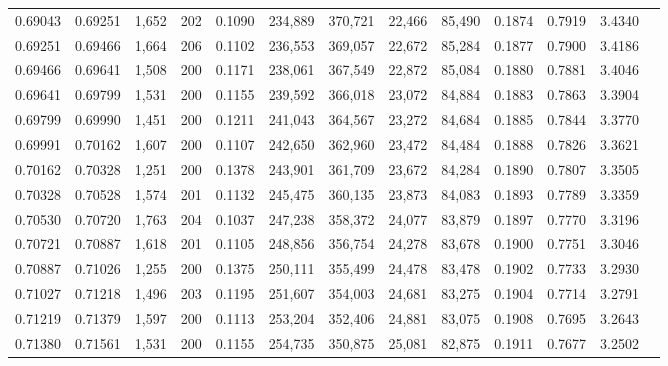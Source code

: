 \begin{tabular}{rrrrrrrrrrrrr}
0.69043 & 0.69251 & 1,652 & 202 &                                     0.1090 & 234,889 & 370,721 &  22,466 &  85,490 & 0.1874 & 0.7919 & 3.4340 \\
0.69251 & 0.69466 & 1,664 & 206 &                                     0.1102 & 236,553 & 369,057 &  22,672 &  85,284 & 0.1877 & 0.7900 & 3.4186 \\
0.69466 & 0.69641 & 1,508 & 200 &                                     0.1171 & 238,061 & 367,549 &  22,872 &  85,084 & 0.1880 & 0.7881 & 3.4046 \\
0.69641 & 0.69799 & 1,531 & 200 &                                     0.1155 & 239,592 & 366,018 &  23,072 &  84,884 & 0.1883 & 0.7863 & 3.3904 \\
0.69799 & 0.69990 & 1,451 & 200 &                                     0.1211 & 241,043 & 364,567 &  23,272 &  84,684 & 0.1885 & 0.7844 & 3.3770 \\
0.69991 & 0.70162 & 1,607 & 200 &                                     0.1107 & 242,650 & 362,960 &  23,472 &  84,484 & 0.1888 & 0.7826 & 3.3621 \\
0.70162 & 0.70328 & 1,251 & 200 &                                     0.1378 & 243,901 & 361,709 &  23,672 &  84,284 & 0.1890 & 0.7807 & 3.3505 \\
0.70328 & 0.70528 & 1,574 & 201 &                                     0.1132 & 245,475 & 360,135 &  23,873 &  84,083 & 0.1893 & 0.7789 & 3.3359 \\
0.70530 & 0.70720 & 1,763 & 204 &                                     0.1037 & 247,238 & 358,372 &  24,077 &  83,879 & 0.1897 & 0.7770 & 3.3196 \\
0.70721 & 0.70887 & 1,618 & 201 &                                     0.1105 & 248,856 & 356,754 &  24,278 &  83,678 & 0.1900 & 0.7751 & 3.3046 \\
0.70887 & 0.71026 & 1,255 & 200 &                                     0.1375 & 250,111 & 355,499 &  24,478 &  83,478 & 0.1902 & 0.7733 & 3.2930 \\
0.71027 & 0.71218 & 1,496 & 203 &                                     0.1195 & 251,607 & 354,003 &  24,681 &  83,275 & 0.1904 & 0.7714 & 3.2791 \\
0.71219 & 0.71379 & 1,597 & 200 &                                     0.1113 & 253,204 & 352,406 &  24,881 &  83,075 & 0.1908 & 0.7695 & 3.2643 \\
0.71380 & 0.71561 & 1,531 & 200 &                                     0.1155 & 254,735 & 350,875 &  25,081 &  82,875 & 0.1911 & 0.7677 & 3.2502 \\

\end{tabular}
